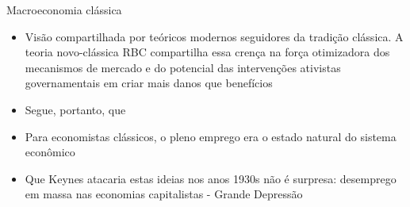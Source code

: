 \documentclass[10pt]{beamer}
\begin{document}
\begin{frame}{Macroeconomia clássica}
    \begin{itemize}
        \item Visão compartilhada por teóricos modernos seguidores da tradição clássica. A teoria novo-clássica RBC compartilha essa crença na força otimizadora dos mecanismos de mercado e do potencial das intervenções ativistas governamentais em criar mais danos que benefícios\bigskip

        \item Segue, portanto, que \bigskip

        \item Para economistas clássicos, o pleno emprego era o estado natural do sistema econômico\bigskip

        \item Que Keynes atacaria estas ideias nos anos 1930s não é surpresa: desemprego em massa nas economias capitalistas - Grande Depressão
    \end{itemize}
\end{frame}
\end{document}
